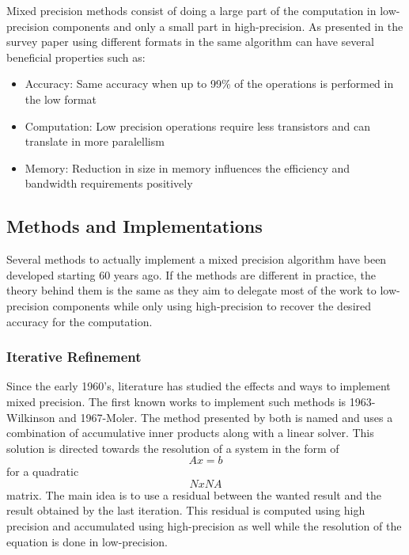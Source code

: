 Mixed precision methods consist of doing a large part of the computation in low-precision components and only a small part in high-precision. As presented in the survey paper \cite{Goddeke2007} using different formats in the same algorithm can have several beneficial properties such as:
\begin{itemize}
  \item Accuracy: Same accuracy when up to 99\% of the operations is performed in the low format
  \item Computation: Low precision operations require less transistors and can translate in more paralellism
  \item Memory: Reduction in size in memory influences the efficiency and bandwidth requirements positively
\end{itemize}

\subsection{Methods and Implementations}
Several methods to actually implement a mixed precision algorithm have been developed starting 60 years ago. If the methods are different in practice, the theory behind them is the same as they aim to delegate most of the work to low-precision components while only using high-precision to recover the desired accuracy for the computation.
\subsubsection{Iterative Refinement}

Since the early 1960's, literature has studied the effects and ways to implement mixed precision. The first known works to implement such methods is 1963-Wilkinson and 1967-Moler. The method presented by both is named  and uses a combination of accumulative inner products along with a linear solver. This solution is directed towards the resolution of a system in the form of \begin{equation} Ax=b \end{equation} for a quadratic \begin{equation} NxN A\end{equation} matrix. The main idea is to use a residual between the wanted result and the result obtained by the last iteration. This residual is computed using high precision and accumulated using high-precision as well while the resolution of the equation is done in low-precision.

